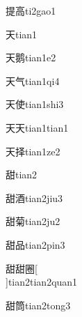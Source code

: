 \begin{verbete}[12;10]{提高}{ti2gao1}
\end{verbete}

\begin{verbete}[4]{天}{tian1}
\end{verbete}

\begin{verbete}[4;12]{天鹅}{tian1e2}
\end{verbete}

\begin{verbete}[4;4]{天气}{tian1qi4}
\end{verbete}

\begin{verbete}[4;8]{天使}{tian1shi3}
\end{verbete}

\begin{verbete}[4;4]{天天}{tian1tian1}
\end{verbete}

\begin{verbete}[4;8]{天择}{tian1ze2}
\end{verbete}

\begin{verbete}[11]{甜}{tian2}
\end{verbete}

\begin{verbete}[11;10]{甜酒}{tian2jiu3}
\end{verbete}

\begin{verbete}[11;11]{甜菊}{tian2ju2}
\end{verbete}

\begin{verbete}[11;9]{甜品}{tian2pin3}
\end{verbete}

\begin{verbete}[11;11;11]{甜甜圈}[\\]{tian2tian2quan1}
\end{verbete}

\begin{verbete}[11;12]{甜筒}{tian2tong3}
\end{verbete}

